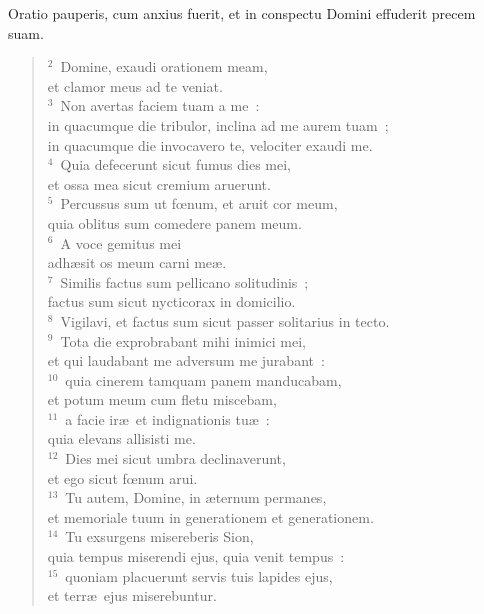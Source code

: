 \lettrine[lines=3,image=true,loversize=0.05,lraise=-0.03]{O}{}ratio pauperis, cum anxius fuerit, et in conspectu Domini effuderit precem suam.
\begin{flushleft}\begin{verse}\vspace{6pt}${}^{2}$~Domine, exaudi orationem meam,\\ et clamor meus ad te veniat.\\
${}^{3}$~Non avertas faciem tuam a me~:\\ in quacumque die tribulor, inclina ad me aurem tuam~;\\ in quacumque die invocavero te, velociter exaudi me.\\
${}^{4}$~Quia defecerunt sicut fumus dies mei,\\ et ossa mea sicut cremium aruerunt.\\
${}^{5}$~Percussus sum ut fœnum, et aruit cor meum,\\ quia oblitus sum comedere panem meum.\\
${}^{6}$~A voce gemitus mei\\ adh\ae sit os meum carni me\ae .\\
${}^{7}$~Similis factus sum pellicano solitudinis~;\\ factus sum sicut nycticorax in domicilio.\\
${}^{8}$~Vigilavi, et factus sum sicut passer solitarius in tecto.\\
${}^{9}$~Tota die exprobrabant mihi inimici mei,\\ et qui laudabant me adversum me jurabant~:\\
${}^{10}$~quia cinerem tamquam panem manducabam,\\ et potum meum cum fletu miscebam,\\
${}^{11}$~a facie ir\ae\ et indignationis tu\ae~:\\ quia elevans allisisti me.\\
${}^{12}$~Dies mei sicut umbra declinaverunt,\\ et ego sicut fœnum arui.\\
${}^{13}$~Tu autem, Domine, in \ae ternum permanes,\\ et memoriale tuum in generationem et generationem.\\
${}^{14}$~Tu exsurgens misereberis Sion,\\ quia tempus miserendi ejus, quia venit tempus~:\\
${}^{15}$~quoniam placuerunt servis tuis lapides ejus,\\ et terr\ae\ ejus miserebuntur.\\

\end{verse}
\end{flushleft}
